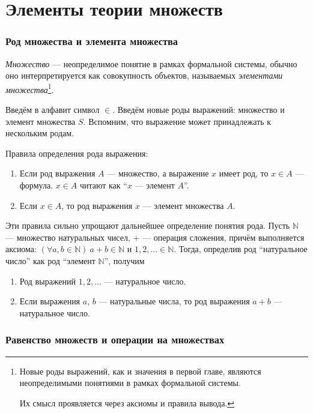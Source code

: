 \part{Элементы теории множеств}

\section{Род множества и элемента множества}

 {\it Множество} --- неопределимое понятие в рамках формальной системы,
обычно оно интерпретируется как совокупность объектов,
называемых {\it элементами множества}\footnote{
	Новые роды выражений, как и значения в первой главе,
	являются неопределимыми понятиями в рамках
	формальной системы.

	Их смысл проявляется через аксиомы и правила вывода.
}.

Введём в алфавит символ $\in$.
Введём новые роды выражений: множество и элемент множества $S$.
Вспомним, что выражение может принадлежать к нескольким родам.

Правила определения рода выражения:
\begin{enumerate}
	\item{}Если род выражения $A$ --- множество, а выражение $x$
	имеет род, то $x\in A$ --- формула.
	$x\in A$ читают как ``$x$ --- элемент $A$''.
	\item{}Если $x\in A$, то род выражения $x$ --- элемент множества $A$.
\end{enumerate}

\newcommand\N{\mathbb N}
Эти правила сильно упрощают дальнейшее определение понятия рода.
Пусть $\N$ --- множество
натуральных чисел, $+$ --- операция сложения, причём выполняется
аксиома: $(\forall a,b\in\N)~a+b\in\N$
и $1,2,...\in\N$. Тогда, определив род ``натуральное число'' как род ``элемент $\N$'',
получим
\begin{enumerate}
	\item{}Род выражений $1,2,...$ --- натуральное число.
	\item{}Если выражения $a$, $b$ --- натуральные числа,
	то род выражения $a+b$ --- натуральное число.
\end{enumerate}

\section{Равенство множеств и операции на множествах}

